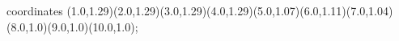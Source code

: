 					coordinates { (1.0,1.29)(2.0,1.29)(3.0,1.29)(4.0,1.29)(5.0,1.07)(6.0,1.11)(7.0,1.04)(8.0,1.0)(9.0,1.0)(10.0,1.0)};